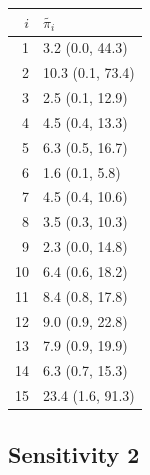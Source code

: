 \begin{table}
    \centering
    \label{tab:my_label}
    \begin{tabular}{|rl|}
    \hline
     $i$ & $\tilde{\pi_{i}}$ \\
    \hline\hline
       1 &   3.2 (0.0, 44.3) \\
       2 &  10.3 (0.1, 73.4) \\
       3 &   2.5 (0.1, 12.9) \\
       4 &   4.5 (0.4, 13.3) \\
       5 &   6.3 (0.5, 16.7) \\
       6 &    1.6 (0.1, 5.8) \\
       7 &   4.5 (0.4, 10.6) \\
       8 &   3.5 (0.3, 10.3) \\
       9 &   2.3 (0.0, 14.8) \\
      10 &   6.4 (0.6, 18.2) \\
      11 &   8.4 (0.8, 17.8) \\
      12 &   9.0 (0.9, 22.8) \\
      13 &   7.9 (0.9, 19.9) \\
      14 &   6.3 (0.7, 15.3) \\
      15 &  23.4 (1.6, 91.3) \\
    \hline
    \end{tabular}
\end{table}

\subsection{Sensitivity 2}

